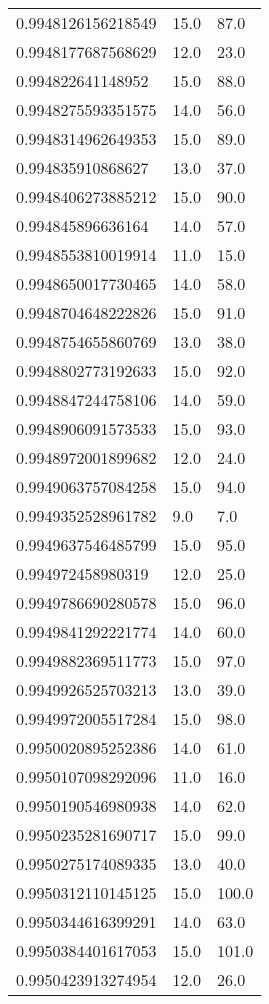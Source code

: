 \begin{center}
\begin{supertabular}[H]{p{0.30\textwidth}p{0.05\textwidth}p{0.05\textwidth}}
0.9948126156218549 & 15.0 & 87.0 \\ 
0.9948177687568629 & 12.0 & 23.0 \\ 
0.994822641148952 & 15.0 & 88.0 \\ 
0.9948275593351575 & 14.0 & 56.0 \\ 
0.9948314962649353 & 15.0 & 89.0 \\ 
0.994835910868627 & 13.0 & 37.0 \\ 
0.9948406273885212 & 15.0 & 90.0 \\ 
0.994845896636164 & 14.0 & 57.0 \\ 
0.9948553810019914 & 11.0 & 15.0 \\ 
0.9948650017730465 & 14.0 & 58.0 \\ 
0.9948704648222826 & 15.0 & 91.0 \\ 
0.9948754655860769 & 13.0 & 38.0 \\ 
0.9948802773192633 & 15.0 & 92.0 \\ 
0.9948847244758106 & 14.0 & 59.0 \\ 
0.9948906091573533 & 15.0 & 93.0 \\ 
0.9948972001899682 & 12.0 & 24.0 \\ 
0.9949063757084258 & 15.0 & 94.0 \\ 
0.9949352528961782 & 9.0 & 7.0 \\ 
0.9949637546485799 & 15.0 & 95.0 \\ 
0.994972458980319 & 12.0 & 25.0 \\ 
0.9949786690280578 & 15.0 & 96.0 \\ 
0.9949841292221774 & 14.0 & 60.0 \\ 
0.9949882369511773 & 15.0 & 97.0 \\ 
0.9949926525703213 & 13.0 & 39.0 \\ 
0.9949972005517284 & 15.0 & 98.0 \\ 
0.9950020895252386 & 14.0 & 61.0 \\ 
0.9950107098292096 & 11.0 & 16.0 \\ 
0.9950190546980938 & 14.0 & 62.0 \\ 
0.9950235281690717 & 15.0 & 99.0 \\ 
0.9950275174089335 & 13.0 & 40.0 \\ 
0.9950312110145125 & 15.0 & 100.0 \\ 
0.9950344616399291 & 14.0 & 63.0 \\ 
0.9950384401617053 & 15.0 & 101.0 \\ 
0.9950423913274954 & 12.0 & 26.0 \\ 

\end{supertabular}
\end{center}
